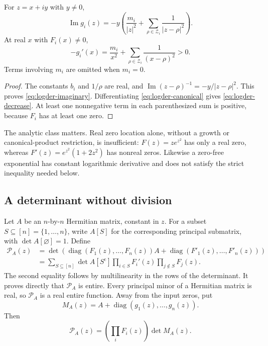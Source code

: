\begin{lemma}\label{lem:strict-logder}
For $z=x+iy$ with $y\neq0$,
\begin{equation}\label{eq:logder-imaginary}
 \operatorname{Im}g_i(z)
 =-y\left(\frac{m_i}{|z|^2}
       +\sum_{\rho\in\mathcal Z_i}\frac1{|z-\rho|^2}\right).
\end{equation}
At real $x$ with $F_i(x)\neq0$,
\begin{equation}\label{eq:logder-decrease}
 -g_i'(x)=
 \frac{m_i}{x^2}
       +\sum_{\rho\in\mathcal Z_i}\frac1{(x-\rho)^2}>0.
\end{equation}
Terms involving $m_i$ are omitted when $m_i=0$.
\end{lemma}
\begin{proof}
The constants $b_i$ and $1/\rho$ are real, and
$\operatorname{Im}(z-\rho)^{-1}=-y/|z-\rho|^2$.
This proves \eqref{eq:logder-imaginary}.
Differentiating \eqref{eq:logder-canonical} gives
\eqref{eq:logder-decrease}.
At least one nonnegative term in each parenthesized sum is positive,
because $F_i$ has at least one zero.
\end{proof}

The analytic class matters.  Real zero location alone, without a growth
or canonical-product restriction, is insufficient: $F(z)=ze^{z^2}$ has
only a real zero, whereas $F'(z)=e^{z^2}(1+2z^2)$ has nonreal zeros.
Likewise a zero-free exponential has constant logarithmic derivative
and does not satisfy the strict inequality needed below.

\subsection{A determinant without division}

Let $A$ be an $n$-by-$n$ Hermitian matrix, constant in $z$.  For a subset
$S\subseteq[n]=\{1,\ldots,n\}$, write $A[S]$ for the corresponding
principal submatrix, with $\det A[\varnothing]=1$.  Define
\begin{align}
 \mathcal P_A(z)
 &=\det\!\left(
       \operatorname{diag}(F_1(z),\ldots,F_n(z))A+
       \operatorname{diag}(F'_1(z),\ldots,F'_n(z))
          \right) \label{eq:entire-determinant}\\
 &=\sum_{S\subseteq[n]}
       \det A[S^{\mathrm c}]
       \prod_{i\in S}F_i'(z)
       \prod_{j\notin S}F_j(z). \label{eq:principal-minor-entire}
\end{align}
The second equality follows by multilinearity in the rows of the
determinant.  It proves directly that $\mathcal P_A$ is entire.
Every principal minor of a Hermitian matrix is real, so $\mathcal P_A$
is a real entire function.
Away from the input zeros, put
\[
 M_A(z)=A+\operatorname{diag}(g_1(z),\ldots,g_n(z)).
\]
Then
\begin{equation}\label{eq:entire-meromorphic-factorization}
 \mathcal P_A(z)=\left(\prod_iF_i(z)\right)\det M_A(z).
\end{equation}

